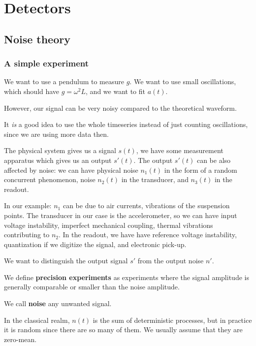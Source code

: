 \documentclass[main.tex]{subfiles}
\begin{document}
\chapter{Detectors}

\section{Noise theory}

\subsection{A simple experiment}


We want to use a pendulum to measure \(g\). We want to use small oscillations, which should have \(g = \omega^2L\), and we want to fit \(a(t)\).

However, our signal can be very noisy compared to the theoretical waveform. 

It \emph{is} a good idea to use the whole timeseries instead of just counting oscillations, since we are using more data then. 

The physical system gives us a signal \(s(t)\), we have some measurement apparatus which gives us an output \(s'(t)\).
The output \(s'(t)\) can be also affected by noise: we can have physical noise \(n_1 (t)\) in the form of a random concurrent phenomenon, noise \(n_2 (t)\) in the transducer, and \(n_3 (t)\) in the readout. 

In our example: \(n_1 \) can be due to air currents, vibrations of the suspension points. The transducer in our case is the accelerometer, so we can have input voltage instability, imperfect mechanical coupling, thermal vibrations contributing to \(n_2 \). 
In the readout, we have have reference voltage instability, quantization if we digitize the signal, and electronic pick-up.

We want to distinguish the output signal \(s'\) from the output noise \(n'\).

We define \textbf{precision experiments} as experiments where the signal amplitude is generally comparable or smaller than the noise amplitude.

We call \textbf{noise} any unwanted signal. 

In the classical realm, \(n(t)\) is the sum of deterministic processes, but in practice it is random since there are so many of them. We usually assume that they are zero-mean.
\end{document}
